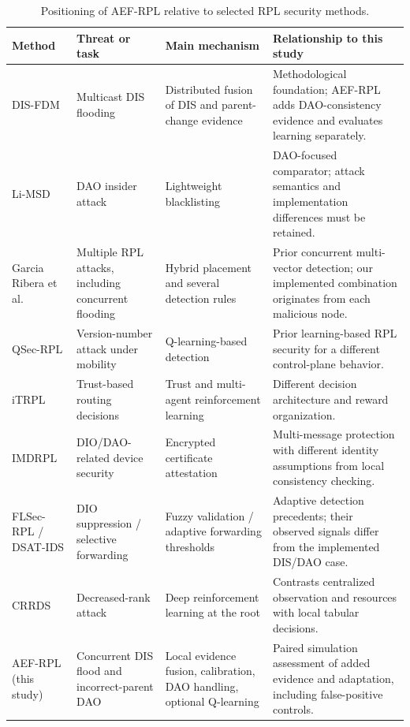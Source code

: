 \documentclass[journal]{IEEEtran}
\begin{document}
\begin{table}[t]
\caption{Positioning of AEF-RPL relative to selected RPL security methods.}
\label{tab:positioning}
\centering
\footnotesize
\setlength{\tabcolsep}{5pt}
\renewcommand{\arraystretch}{1.16}
\begin{tabularx}{\textwidth}{@{}p{}p{}p{}X@{}}
\toprule
Method & Threat or task & Main mechanism & Relationship to this study \\
\midrule
DIS-FDM \cite{prajisha2025} & Multicast DIS flooding & Distributed fusion of DIS and parent-change evidence & Methodological foundation; AEF-RPL adds DAO-consistency evidence and evaluates learning separately. \\
Li-MSD \cite{limsd2024} & DAO insider attack & Lightweight blacklisting & DAO-focused comparator; attack semantics and implementation differences must be retained. \\
Garcia Ribera et al.\ \cite{garciaribera2022} & Multiple RPL attacks, including concurrent flooding & Hybrid placement and several detection rules & Prior concurrent multi-vector detection; our implemented combination originates from each malicious node. \\
QSec-RPL \cite{qsecrpl2023} & Version-number attack under mobility & Q-learning-based detection & Prior learning-based RPL security for a different control-plane behavior. \\
iTRPL \cite{itrpl2024} & Trust-based routing decisions & Trust and multi-agent reinforcement learning & Different decision architecture and reward organization. \\
IMDRPL \cite{imdrpl2023} & DIO/DAO-related device security & Encrypted certificate attestation & Multi-message protection with different identity assumptions from local consistency checking. \\
FLSec-RPL / DSAT-IDS \cite{flsecrpl2024,dsatids2024} & DIO suppression / selective forwarding & Fuzzy validation / adaptive forwarding thresholds & Adaptive detection precedents; their observed signals differ from the implemented DIS/DAO case. \\
CRRDS \cite{haqdad2026} & Decreased-rank attack & Deep reinforcement learning at the root & Contrasts centralized observation and resources with local tabular decisions. \\
AEF-RPL (this study) & Concurrent DIS flood and incorrect-parent DAO & Local evidence fusion, calibration, DAO handling, optional Q-learning & Paired simulation assessment of added evidence and adaptation, including false-positive controls. \\
\bottomrule
\end{tabularx}
\end{table}
\end{document}
